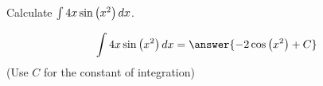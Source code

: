 \documentclass{ximera}
\author{Jim Talamo}
\begin{document}
\begin{exercise}
Calculate $\int 4x \sin\left(x^2\right) \mathop{}\!d x $.


\[
 \int 4x \sin\left(x^2\right) \d x = \answer{ -2\cos\left(x^2\right)  + C } 
\]
(Use $C$ for the constant of integration)

\end{exercise}
\end{document}
